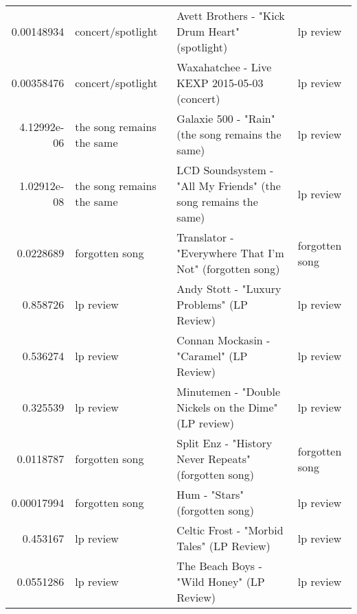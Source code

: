 \documentclass[letterpaper,10pt]{article}
\begin{document}
\begin{table}[H]
\begin{adjustbox}{max width=\linewidth}
\begin{tabular}{rlll}
  0.00148934  & concert/spotlight         & Avett Brothers - "Kick Drum Heart" (spotlight)                                                               & lp review                 \\
  0.00358476  & concert/spotlight         & Waxahatchee - Live KEXP 2015-05-03 (concert)                                                                 & lp review                 \\
  4.12992e-06 & the song remains the same & Galaxie 500 - "Rain" (the song remains the same)                                                             & lp review                 \\
  1.02912e-08 & the song remains the same & LCD Soundsystem - "All My Friends" (the song remains the same)                                               & lp review                 \\
  0.0228689   & forgotten song            & Translator - "Everywhere That I'm Not" (forgotten song)                                                      & forgotten song            \\
  0.858726    & lp review                 & Andy Stott - "Luxury Problems" (LP Review)                                                                   & lp review                 \\
  0.536274    & lp review                 & Connan Mockasin - "Caramel" (LP Review)                                                                      & lp review                 \\
  0.325539    & lp review                 & Minutemen - "Double Nickels on the Dime" (LP review)                                                         & lp review                 \\
  0.0118787   & forgotten song            & Split Enz - "History Never Repeats" (forgotten song)                                                         & forgotten song            \\
  0.00017994  & forgotten song            & Hum - "Stars" (forgotten song)                                                                               & lp review                 \\
  0.453167    & lp review                 & Celtic Frost - "Morbid Tales" (LP Review)                                                                    & lp review                 \\
  0.0551286   & lp review                 & The Beach Boys - "Wild Honey" (LP Review)                                                                    & lp review                 \\

\end{tabular}
\end{adjustbox}
\end{table}
\end{document}
